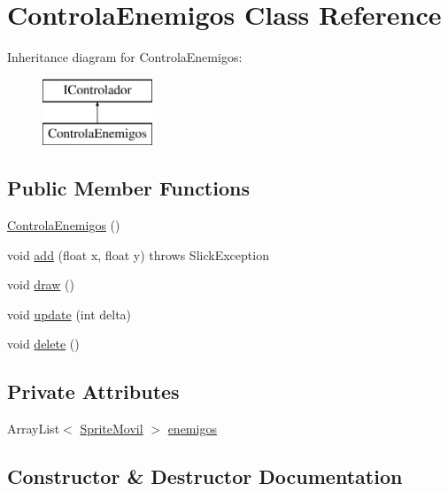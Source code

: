 \hypertarget{class_controla_enemigos}{}\section{Controla\+Enemigos Class Reference}
\label{class_controla_enemigos}
Inheritance diagram for Controla\+Enemigos\+:\begin{figure}[H]
\begin{center}
\leavevmode
\includegraphics[height=2.000000cm]{class_controla_enemigos}
\end{center}
\end{figure}
\subsection*{Public Member Functions}
\begin{DoxyCompactItemize}
\item 
\mbox{\hyperlink{class_controla_enemigos_ae4a82e766666de8d91b20b6e038ac42c}{Controla\+Enemigos}} ()
\item 
void \mbox{\hyperlink{class_controla_enemigos_a891536374c60a0b946b72a3c02458952}{add}} (float x, float y)  throws Slick\+Exception 
\item 
void \mbox{\hyperlink{class_controla_enemigos_af3ef61229a21ef509dcf8397e870666e}{draw}} ()
\item 
void \mbox{\hyperlink{class_controla_enemigos_a0f43235e03225c9fbd077c5bfd2df923}{update}} (int delta)
\item 
void \mbox{\hyperlink{class_controla_enemigos_a3ae667fde8e2bf5a38a4ada28ac6db26}{delete}} ()
\end{DoxyCompactItemize}
\subsection*{Private Attributes}
\begin{DoxyCompactItemize}
\item 
Array\+List$<$ \mbox{\hyperlink{class_sprite_movil}{Sprite\+Movil}} $>$ \mbox{\hyperlink{class_controla_enemigos_a00bc1b9f42ef341339d0d7a00ed60319}{enemigos}}
\end{DoxyCompactItemize}


\subsection{Constructor \& Destructor Documentation}
\mbox{\label{class_controla_enemigos_ae4a82e766666de8d91b20b6e038ac42c}} 
